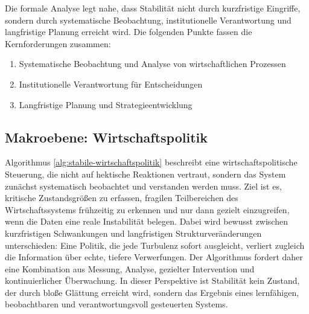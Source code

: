 \documentclass[a4paper, 12pt, twoside, openright]{report}
\theoremstyle{definition}
\theoremstyle{definition}
\begin{document}
Die formale Analyse legt nahe, dass Stabilität nicht durch kurzfristige Eingriffe, sondern durch systematische Beobachtung, institutionelle Verantwortung und langfristige Planung erreicht wird. Die folgenden Punkte fassen die Kernforderungen zusammen:
\begin{enumerate}
\item Systematische Beobachtung und Analyse von wirtschaftlichen Prozessen
\item Institutionelle Verantwortung für Entscheidungen
\item Langfristige Planung und Strategieentwicklung
\end{enumerate}

\subsection{Makroebene: Wirtschaftspolitik}

Algorithmus \ref{alg:stabile-wirtschaftspolitik} beschreibt eine wirtschaftspolitische Steuerung, die nicht auf hektische Reaktionen vertraut, sondern das System zunächst systematisch beobachtet und verstanden werden muss. Ziel ist es, kritische Zustandsgrößen zu erfassen, fragilen Teilbereichen des Wirtschaftssystems frühzeitig zu erkennen und nur dann gezielt einzugreifen, wenn die Daten eine reale Instabilität belegen. Dabei wird bewusst zwischen kurzfristigen Schwankungen und langfristigen Strukturveränderungen unterschieden: Eine Politik, die jede Turbulenz sofort ausgleicht, verliert zugleich die Information über echte, tiefere Verwerfungen. Der Algorithmus fordert daher eine Kombination aus Messung, Analyse, gezielter Intervention und kontinuierlicher Überwachung. In dieser Perspektive ist Stabilität kein Zustand, der durch bloße Glättung erreicht wird, sondern das Ergebnis eines lernfähigen, beobachtbaren und verantwortungsvoll gesteuerten Systems.
\end{document}
